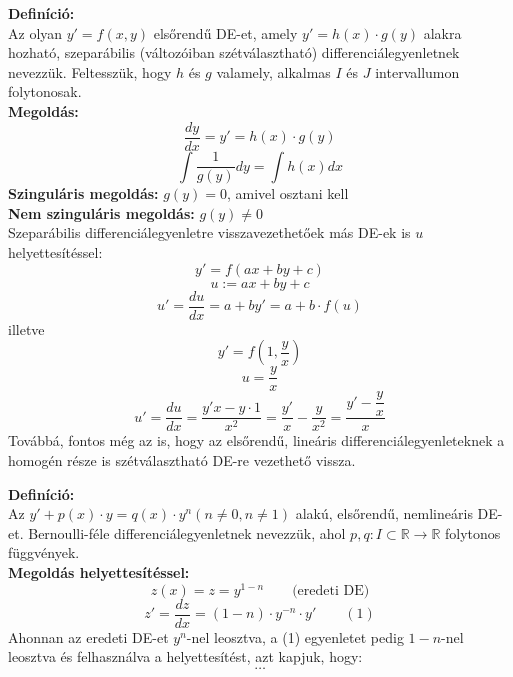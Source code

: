 \documentclass[11pt,a4paper]{article}
\begin{document}
    \begin{tcolorbox}[colback=red!5!white,colframe=red!60!black,title= 1. Szeparábilis és arra visszavezethető DE]
        \textbf{Definíció:} \\
        Az olyan $y' = f(x,y)$ elsőrendű DE-et, amely $y' = h(x) \cdot g(y)$ alakra hozható, szeparábilis (változóiban szétválasztható) differenciálegyenletnek nevezzük. Feltesszük, hogy $h$ és $g$ valamely, alkalmas $I$ és $J$ intervallumon folytonosak. \\
        \textbf{Megoldás:} \\
        $$\dfrac{dy}{dx} = y' = h(x) \cdot g(y)$$
        $$\int\dfrac{1}{g(y)}dy = \int h(x)dx$$
        \textbf{Szinguláris megoldás:} $g(y) = 0$, amivel osztani kell \\
        \textbf{Nem szinguláris megoldás:} $g(y) \neq 0$ \\
        Szeparábilis differenciálegyenletre visszavezethetőek más DE-ek is $u$ helyettesítéssel:
        $$y' = f(ax + by + c)$$
        $$u := ax + by + c$$
        $$u' = \dfrac{du}{dx} = a + by' = a + b \cdot f(u)$$
        illetve
        $$y' = f(1,\dfrac{y}{x})$$
        $$u = \dfrac{y}{x}$$
        $$u' = \dfrac{du}{dx} = \dfrac{y'x - y \cdot 1}{x^2} = \dfrac{y'}{x} - \dfrac{y}{x^2} = \dfrac{y' - \dfrac{y}{x}}{x}$$
        Továbbá, fontos még az is, hogy az elsőrendű, lineáris differenciálegyenleteknek a homogén része is szétválasztható DE-re vezethető vissza.
    \end{tcolorbox}

    \begin{tcolorbox}[colback=red!5!white,colframe=red!60!black,title= 2. Bernoulli-féle DE]
       \textbf{Definíció:} \\
       Az $y' + p(x) \cdot y = q(x) \cdot y^n (n \neq 0, n \neq 1)$ alakú, elsőrendű, nemlineáris DE-et. Bernoulli-féle differenciálegyenletnek nevezzük, ahol $p, q: I \subset \mathbb{R} \rightarrow \mathbb{R}$ folytonos függvények. \\
       \textbf{Megoldás helyettesítéssel:} \\
       $$z(x) = z = y^{1-n} \quad\quad \text{(eredeti DE)}$$
       $$z' = \dfrac{dz}{dx} = (1-n) \cdot y^{-n} \cdot y' \quad\quad (1)$$
       Ahonnan az eredeti DE-et $y^n$-nel leosztva, a (1) egyenletet pedig $1-n$-nel leosztva és felhasználva a helyettesítést, azt kapjuk, hogy:
       $$\dots$$
    \end{tcolorbox}
\end{document}
